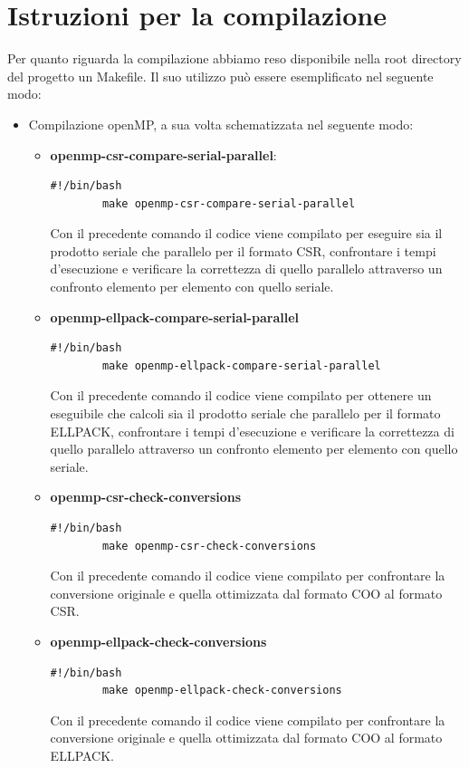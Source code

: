 \documentclass{article}
\begin{document}
\section{Istruzioni per la compilazione}
Per quanto riguarda la compilazione abbiamo reso disponibile nella root directory del progetto un Makefile. Il suo utilizzo può essere esemplificato nel seguente modo:
\begin{itemize}
    \item Compilazione openMP, a sua volta schematizzata nel seguente modo:
    \begin{itemize}
        \item \textbf{openmp-csr-compare-serial-parallel}: \begin{lstlisting}[style=bashstyle]
        #!/bin/bash
        make openmp-csr-compare-serial-parallel 
        \end{lstlisting} Con il precedente comando il codice viene compilato per eseguire sia il prodotto seriale che parallelo per il formato CSR, confrontare i tempi d'esecuzione e verificare la correttezza di quello parallelo attraverso un confronto elemento per elemento con quello seriale.
        \item \textbf{openmp-ellpack-compare-serial-parallel}  \begin{lstlisting}[style=bashstyle]
        #!/bin/bash
        make openmp-ellpack-compare-serial-parallel
        \end{lstlisting} Con il precedente comando il codice viene compilato per ottenere un eseguibile che calcoli sia il prodotto seriale che parallelo per il formato ELLPACK, confrontare i tempi d'esecuzione e verificare la correttezza di quello parallelo attraverso un confronto elemento per elemento con quello seriale.
        \item \textbf{openmp-csr-check-conversions}
         \begin{lstlisting}[style=bashstyle]
        #!/bin/bash
        make openmp-csr-check-conversions
        \end{lstlisting} Con il precedente comando il codice viene compilato per confrontare la conversione originale e quella ottimizzata dal formato COO al formato CSR.
        \item \textbf{openmp-ellpack-check-conversions}
        \begin{lstlisting}[style=bashstyle]
        #!/bin/bash
        make openmp-ellpack-check-conversions
        \end{lstlisting} Con il precedente comando il codice viene compilato per confrontare la conversione originale e quella ottimizzata dal formato COO al formato ELLPACK.

\end{itemize}
\end{itemize}
\end{document}
